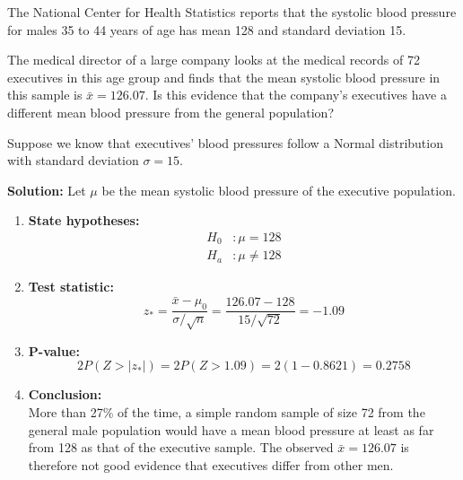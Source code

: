 \begin{example}

The National Center for Health Statistics reports that the systolic blood pressure for males 35 to 44 years of age has mean 128 and standard deviation 15. 

The medical director of a large company looks at the medical records of 72 executives in this age group and finds that the mean systolic blood pressure in this sample is $\bar{x} = 126.07$. Is this evidence that the company’s executives have a different mean blood pressure from the general population?

Suppose we know that executives’ blood pressures follow a Normal distribution with standard deviation $\sigma = 15$.

\textbf{Solution:} Let $\mu$ be the mean systolic blood pressure of the executive population.

\begin{enumerate}
    \item \textbf{State hypotheses:} \\
    \begin{align*}
H_0 &: \mu = 128 \\
H_a &: \mu \ne 128
\end{align*}

    
    \item \textbf{Test statistic:} \\
    \[
    z_\ast = \frac{\bar{x} - \mu_0}{\sigma / \sqrt{n}} = \frac{126.07 - 128}{15 / \sqrt{72}} = -1.09
    \]

    \item \textbf{P-value:} \\
    \[
    2P(Z > |z_\ast|) = 2P(Z > 1.09) = 2(1 - 0.8621) = 0.2758
    \]

    \item \textbf{Conclusion:} \\
    More than 27\% of the time, a simple random sample of size 72 from the general male population would have a mean blood pressure at least as far from 128 as that of the executive sample. The observed $\bar{x} = 126.07$ is therefore not good evidence that executives differ from other men.
\end{enumerate}

\end{example}
